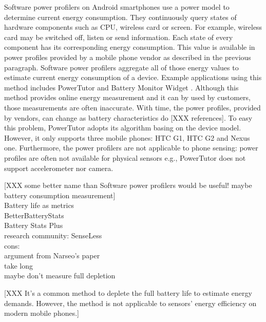 Software power profilers on Android smartphones use a power model to determine current energy consumption. They continuously query states of hardware components such as CPU, wireless card or screen. For example, wireless card may be switched off, listen or send information. Each state of every component has its corresponding energy consumption. This value is available in power profiles provided by a mobile phone vendor as described in the previous paragraph. Software power profilers aggregate all of those energy values to estimate current energy consumption of a device. Example applications using this method includes PowerTutor \cite{zhang:powertutor} and Battery Monitor Widget \cite{googleplay:batterymonitorwidget}. Although this method provides online energy measurement and it can by used by customers, those measurements are often inaccurate. With time, the power profiles, provided by vendors, can change as battery characteristics do [XXX references]. To easy this problem, PowerTutor adopts its algorithm basing on the device model. However, it only supports three mobile phones: HTC G1, HTC G2 and Nexus one. Furthermore, the power profilers are not applicable to phone sensing: power profiles are often not available for physical sensors e.g., PowerTutor does not support accelerometer nor camera.

[XXX some better name than Software power profilers would be useful!
 maybe battery consumption measurement]\\

Battery life as metrics\\
	BetterBatteryStats\\
	Battery Stats Plus\\
	research community: SenseLess\cite{benabdesslem:senseless}\\
	cons:\\
		argument from Narseo's paper\\
		take long\\
			maybe don't measure full depletion
			
			[XXX
 It's a common method to deplete the full battery life to estimate energy demands. However, the method is not applicable to sensors' energy efficiency on modern mobile phones.]
	
	
	
